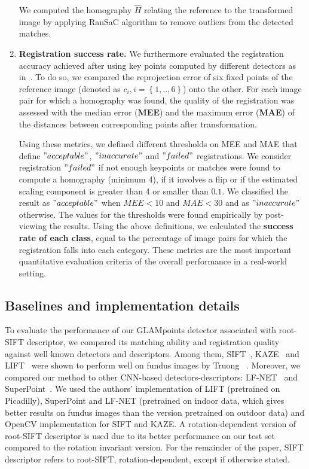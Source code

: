 \begin{enumerate}
We computed the homography $\hat{H}$ relating the reference to the transformed image  by applying \ac{RanSaC} algorithm to remove outliers from the detected matches.

\item \textbf{Registration success rate.} We furthermore evaluated the  registration accuracy achieved after using key points computed by different detectors as in~\cite{Chen2010,Wang2015}.  To do so, we compared the reprojection error of six fixed points of the reference image (denoted as $c_{i}, i=\left \{ 1,..,6 \right \}$) onto the other. For each image pair for which a homography was found, the quality of the registration was assessed with 
the median error (\textbf{MEE}) and the maximum error (\textbf{MAE}) of the distances between corresponding points after transformation.


Using these metrics, we defined different thresholds on MEE and MAE that define $"acceptable"$, $"inaccurate"$ and $"failed"$ registrations. We consider registration $"failed"$ if not enough keypoints or matches were found to compute a homography (minimum 4), if it involves a flip or if the estimated scaling component is greater than 4 or smaller than $0.1$. We classified the result as $"acceptable"$ when $MEE<10$ and $MAE<30$ and as $"inaccurate"$ otherwise. The values for the thresholds were found empirically by post-viewing the results. 
Using the above definitions, we calculated the \textbf{success rate of each class}, equal to the percentage of image pairs for which the registration falls into each category. These metrics are the most important quantitative evaluation criteria of the overall performance in a real-world setting.

\end{enumerate}

\subsection{Baselines and implementation details}

To evaluate the performance of our GLAMpoints detector associated with root-SIFT descriptor, we compared its matching ability and registration quality against well known detectors and descriptors. Among them, SIFT~\cite{sift}, KAZE~\cite{Alcantarilla2012} and LIFT~\cite{LIFT} were shown to perform well on fundus images by Truong \etal~\cite{truong}. Moreover, we compared our method to other CNN-based detectors-descriptors: \ac{LF-NET}~\cite{Trulls} and SuperPoint~\cite{Detone}. We used the authors' implementation of LIFT (pretrained on Picadilly), SuperPoint and \ac{LF-NET} (pretrained on indoor data, which gives better results on fundus images than the version pretrained on outdoor data) and OpenCV implementation for \ac{SIFT} and KAZE. A rotation-dependent version of root-\ac{SIFT} descriptor is used due to its better performance on our test set compared to the rotation invariant version. For the remainder of the paper, \ac{SIFT} descriptor refers to root-SIFT, rotation-dependent, except if otherwise stated.



